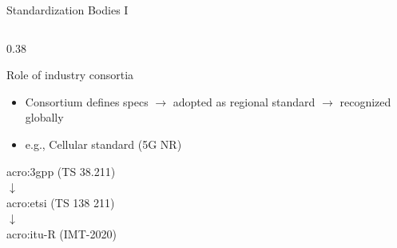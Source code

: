 \begin{frame}{Standardization Bodies I}
\begin{columns}[onlytextwidth]
\begin{column}{0.38\textwidth}
\begin{block}{Role of industry consortia}
\begin{itemize}
          \item Consortium defines specs $\rightarrow$ adopted as regional standard $\rightarrow$ recognized globally
          \item e.g., Cellular standard (5G NR)
        \end{itemize}
        \centering
        \Gls{acro:3gpp} (TS 38.211)\\
        $\downarrow$\\
        \Gls{acro:etsi} (TS 138 211)\\
        $\downarrow$\\
        \Gls{acro:itu}-R (IMT-2020)\\
      \end{block}
    \end{column}
  \end{columns}
\end{frame}

